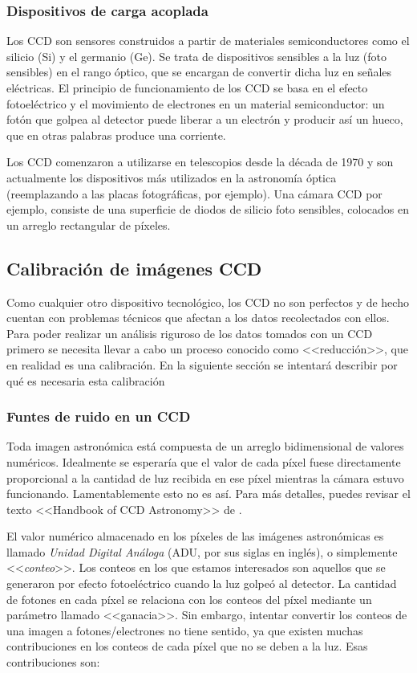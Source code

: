 \subsubsection{Dispositivos de carga acoplada}
Los CCD son sensores construidos a partir de materiales semiconductores como el silicio (Si) y el germanio (Ge). Se trata de dispositivos sensibles a la luz (foto sensibles) en el rango óptico, que se encargan de convertir dicha luz en señales eléctricas. El principio de funcionamiento de los CCD se basa en el efecto fotoeléctrico y el movimiento de electrones en un material semiconductor: un fotón que golpea al detector puede liberar a un electrón y producir así un hueco, que en otras palabras produce una corriente. 

Los CCD comenzaron a utilizarse en telescopios desde la década de 1970 y son actualmente los dispositivos más utilizados en la astronomía óptica (reemplazando a las placas fotográficas, por ejemplo). Una cámara CCD por ejemplo, consiste de una superficie de diodos de silicio foto sensibles, colocados en un arreglo rectangular de píxeles. 

\subsection{Calibración de imágenes CCD}
Como cualquier otro dispositivo tecnológico, los CCD no son perfectos y de hecho cuentan con problemas técnicos que afectan a los datos recolectados con ellos. Para poder realizar un análisis riguroso de los datos tomados con un CCD primero se necesita llevar a cabo un proceso conocido como <<reducción>>, que en realidad es una calibración. En la siguiente sección se intentará describir por qué es necesaria esta calibración

\subsubsection{Funtes de ruido en un CCD}
Toda imagen astronómica está compuesta de un arreglo bidimensional de valores numéricos. Idealmente se esperaría que el valor de cada píxel fuese directamente proporcional a la cantidad de luz recibida en ese píxel mientras la cámara estuvo funcionando. Lamentablemente esto no es así. Para más detalles, puedes revisar el texto <<Handbook of CCD Astronomy>> de \citet{howell2006handbook}.

El valor numérico almacenado en los píxeles de las imágenes astronómicas es llamado \emph{Unidad Digital Análoga} (ADU, por sus siglas en inglés), o simplemente <<\emph{conteo}>>. Los conteos en los que estamos interesados son aquellos que se generaron por efecto fotoeléctrico cuando la luz golpeó al detector. La cantidad de fotones en cada píxel se relaciona con los conteos del píxel mediante un parámetro llamado <<ganacia>>. Sin embargo, intentar convertir los conteos de una imagen a fotones/electrones no tiene sentido, ya que existen muchas contribuciones en los conteos de cada píxel que no se deben a la luz. Esas contribuciones son:

